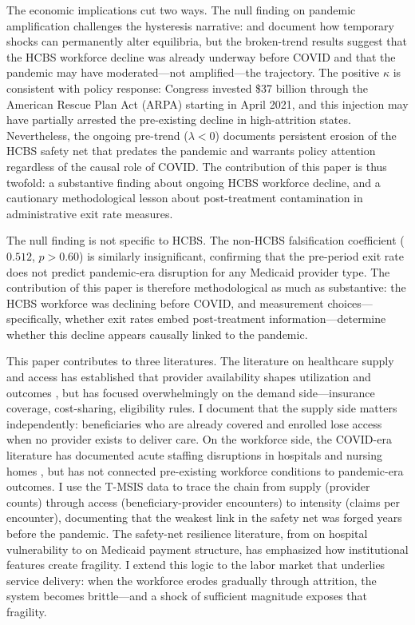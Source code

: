 \documentclass[12pt]{article}
\begin{document}
The economic implications cut two ways. The null finding on pandemic amplification challenges the hysteresis narrative: \citet{blanchardsummers1986} and \citet{yagan2019} document how temporary shocks can permanently alter equilibria, but the broken-trend results suggest that the HCBS workforce decline was already underway before COVID and that the pandemic may have moderated---not amplified---the trajectory. The positive $\kappa$ is consistent with policy response: Congress invested \$37 billion through the American Rescue Plan Act (ARPA) starting in April 2021, and this injection may have partially arrested the pre-existing decline in high-attrition states. Nevertheless, the ongoing pre-trend ($\lambda < 0$) documents persistent erosion of the HCBS safety net that predates the pandemic and warrants policy attention regardless of the causal role of COVID. The contribution of this paper is thus twofold: a substantive finding about ongoing HCBS workforce decline, and a cautionary methodological lesson about post-treatment contamination in administrative exit rate measures.

The null finding is not specific to HCBS. The non-HCBS falsification coefficient ($0.512$, $p > 0.60$) is similarly insignificant, confirming that the pre-period exit rate does not predict pandemic-era disruption for any Medicaid provider type. The contribution of this paper is therefore methodological as much as substantive: the HCBS workforce was declining before COVID, and measurement choices---specifically, whether exit rates embed post-treatment information---determine whether this decline appears causally linked to the pandemic.

This paper contributes to three literatures. The literature on healthcare supply and access has established that provider availability shapes utilization and outcomes \citep{finkelstein2012,baicker2013}, but has focused overwhelmingly on the demand side---insurance coverage, cost-sharing, eligibility rules. I document that the supply side matters independently: beneficiaries who are already covered and enrolled lose access when no provider exists to deliver care. On the workforce side, the COVID-era literature has documented acute staffing disruptions in hospitals \citep{sinsky2021covid} and nursing homes \citep{alexander2020}, but has not connected pre-existing workforce conditions to pandemic-era outcomes. I use the T-MSIS data to trace the chain from supply (provider counts) through access (beneficiary-provider encounters) to intensity (claims per encounter), documenting that the weakest link in the safety net was forged years before the pandemic. The safety-net resilience literature, from \citet{dranove2000} on hospital vulnerability to \citet{duggan2000} on Medicaid payment structure, has emphasized how institutional features create fragility. I extend this logic to the labor market that underlies service delivery: when the workforce erodes gradually through attrition, the system becomes brittle---and a shock of sufficient magnitude exposes that fragility.
\end{document}
